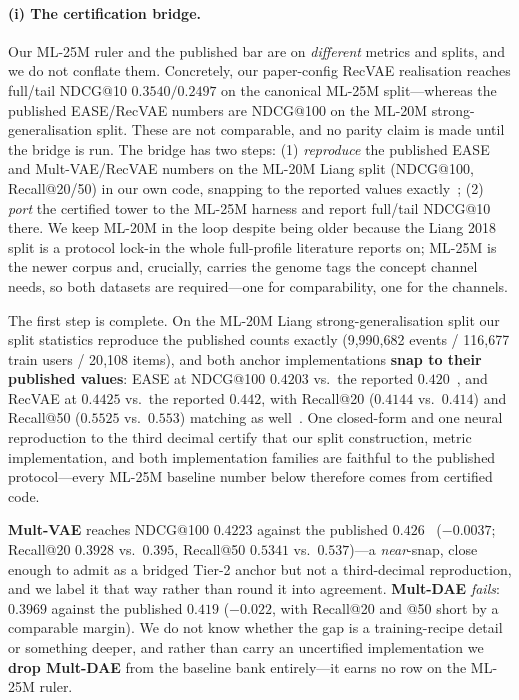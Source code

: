\documentclass[11pt]{article}
\begin{document}
\paragraph{(i) The certification bridge.}\label{sec:bridge}
Our ML-25M ruler and the published bar are on \emph{different} metrics and splits, and we do not conflate them.
Concretely, our paper-config RecVAE realisation reaches full/tail NDCG@10 $0.3540/0.2497$ on the canonical ML-25M
split---whereas the published EASE/RecVAE numbers are NDCG@100 on the ML-20M strong-generalisation split. These are
not comparable, and no parity claim is made until the bridge is run. The bridge has two steps: (1) \emph{reproduce} the published EASE and Mult-VAE/RecVAE numbers on the ML-20M Liang
split (NDCG@100, Recall@20/50) in our own code, snapping to the reported values exactly~\cite{steck2019ease,liang2018variational,ren2020recvae};
(2) \emph{port} the certified tower to the ML-25M harness and report full/tail NDCG@10 there. We keep ML-20M in the
loop despite being older because the Liang 2018 split is a protocol lock-in the whole full-profile literature reports
on; ML-25M is the newer corpus and, crucially, carries the genome tags the concept channel needs, so both datasets are
required---one for comparability, one for the channels.

The first step is complete. On the ML-20M Liang strong-generalisation split our split statistics reproduce the
published counts exactly (9{,}990{,}682 events / 116{,}677 train users / 20{,}108 items), and both anchor
implementations \textbf{snap to their published values}: EASE at NDCG@100 $0.4203$ vs.\ the reported
$0.420$~\cite{steck2019ease}, and RecVAE at $0.4425$ vs.\ the reported $0.442$, with Recall@20 ($0.4144$ vs.\
$0.414$) and Recall@50 ($0.5525$ vs.\ $0.553$) matching as well~\cite{ren2020recvae}. One closed-form and one neural
reproduction to the third decimal certify that our split construction, metric implementation, and both
implementation families are faithful to the published protocol---every ML-25M baseline number below therefore
comes from certified code.

\textbf{Mult-VAE} reaches NDCG@100 $0.4223$ against the published $0.426$~\cite{liang2018variational}
($-0.0037$; Recall@20 $0.3928$ vs.\ $0.395$, Recall@50 $0.5341$ vs.\ $0.537$)---a \emph{near}-snap, close enough to
admit as a bridged Tier-2 anchor but not a third-decimal reproduction, and we label it that way rather than round it
into agreement. \textbf{Mult-DAE} \emph{fails}: $0.3969$ against the published $0.419$ ($-0.022$, with Recall@20 and
@50 short by a comparable margin). We do not know whether the gap is a training-recipe detail or something deeper, and
rather than carry an uncertified implementation we \textbf{drop Mult-DAE} from the baseline bank entirely---it earns no
row on the ML-25M ruler.
\end{document}
